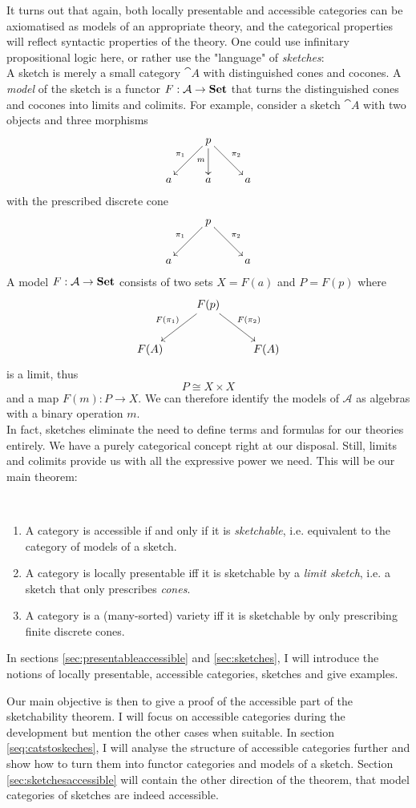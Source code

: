 It turns out that again, both locally presentable and accessible categories can be axiomatised as models of an appropriate theory, and the categorical properties will reflect syntactic properties of the theory. One could use infinitary propositional logic here, or rather use the "language" of \emph{sketches}: \\

A sketch is merely a small category $\cat A$ with distinguished cones and cocones. A \emph{model} of the sketch is a functor $F : \mathcal{A} \to \mathbf{Set}$ that turns the distinguished cones and cocones into limits and colimits. For example, consider a sketch $\cat A$ with two objects and three morphisms
\[
\xymatrix{
  & p \ar[rd]^{\pi_2} \ar[d]_{m} \ar[ld]_{\pi_1} & \\
a & a & a
}\]
with the prescribed discrete cone
\[
\xymatrix{
  & p \ar[rd]^{\pi_2} \ar[ld]_{\pi_1} & \\
a & & a
}\]
A model $F : \mathcal{A} \to \mathbf{Set}$ consists of two sets $X=F(a)$ and $P=F(p)$ where
\[
\xymatrix{
  & F(p) \ar[rd]^{F(\pi_2)} \ar[ld]_{F(\pi_1)} & \\
F(A) & & F(A)
}\]
is a limit, thus \[ P \cong X \times X \] 
and a map $F(m) : P \to X$. We can therefore identify the models of $\mathcal A$ as algebras with a binary operation $m$. \\

In fact, sketches eliminate the need to define terms and formulas for our theories entirely. We have a purely categorical concept right at our disposal. Still, limits and colimits provide us with all the expressive power we need. This will be our main theorem:

\begin{Theorem}[Sketchability]\ \\
\begin{enumerate}
\item A category is accessible if and only if it is \emph{sketchable}, i.e. equivalent to the category of models of a sketch. 

\item A category is locally presentable iff it is sketchable by a \emph{limit sketch}, i.e. a sketch that only prescribes \emph{cones}.

\item A category is a (many-sorted) variety iff it is sketchable by only prescribing finite discrete cones.
\end{enumerate}
\end{Theorem}

In sections \ref{sec:presentableaccessible} and \ref{sec:sketches}, I will introduce the notions of locally presentable, accessible categories, sketches and give examples. 

Our main objective is then to give a proof of the accessible part of the sketchability theorem. I will focus on accessible categories during the development but mention the other cases when suitable. In section \ref{seq:catstoskeches}, I will analyse the structure of accessible categories further and show how to turn them into functor categories and models of a sketch. Section \ref{sec:sketchesaccessible} will contain the other direction of the theorem, that model categories of sketches are indeed accessible.